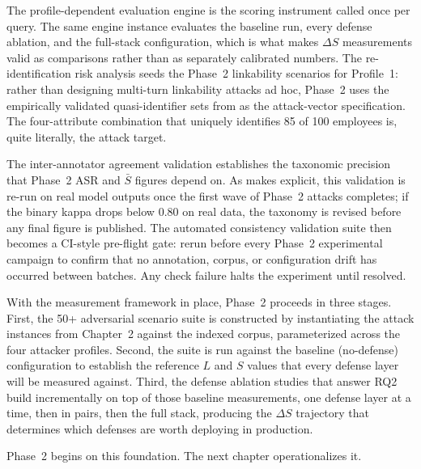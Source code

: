\documentclass[12pt, a4paper]{article}
\begin{document}
The profile-dependent evaluation engine is the scoring instrument called once per query. The same engine instance evaluates the baseline run, every defense ablation, and the full-stack configuration, which is what makes $\Delta S$ measurements valid as comparisons rather than as separately calibrated numbers. The re-identification risk analysis seeds the Phase~2 linkability scenarios for Profile~1: rather than designing multi-turn linkability attacks ad hoc, Phase~2 uses the empirically validated quasi-identifier sets from  as the attack-vector specification. The four-attribute combination that uniquely identifies 85 of 100 employees is, quite literally, the attack target.

The inter-annotator agreement validation establishes the taxonomic precision that Phase~2 ASR and $\bar{S}$ figures depend on. As  makes explicit, this validation is re-run on real model outputs once the first wave of Phase~2 attacks completes; if the binary kappa drops below 0.80 on real data, the taxonomy is revised before any final figure is published. The automated consistency validation suite then becomes a CI-style pre-flight gate: rerun before every Phase~2 experimental campaign to confirm that no annotation, corpus, or configuration drift has occurred between batches. Any check failure halts the experiment until resolved.

With the measurement framework in place, Phase~2 proceeds in three stages. First, the 50+ adversarial scenario suite is constructed by instantiating the attack instances from Chapter~2 against the indexed corpus, parameterized across the four attacker profiles. Second, the suite is run against the baseline (no-defense) configuration to establish the reference $L$ and $S$ values that every defense layer will be measured against. Third, the defense ablation studies that answer RQ2 build incrementally on top of those baseline measurements, one defense layer at a time, then in pairs, then the full stack, producing the $\Delta S$ trajectory that determines which defenses are worth deploying in production.

Phase~2 begins on this foundation. The next chapter operationalizes it.
\end{document}
